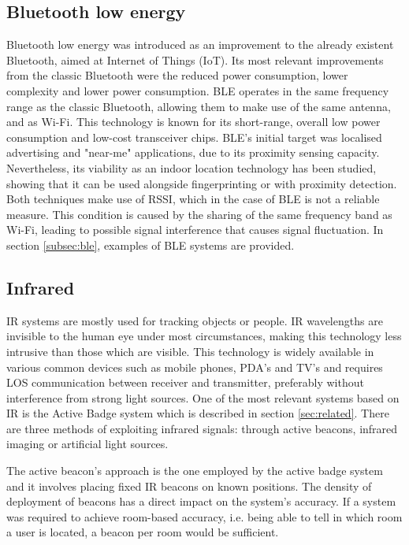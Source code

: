   
  
  
\subsection{Bluetooth low energy}  
\label{subsec:ble-tech}  
  
  
Bluetooth low energy was introduced as an improvement to the already existent Bluetooth, aimed at Internet of Things (IoT). Its most relevant improvements from the classic Bluetooth were the reduced power consumption, lower complexity and lower power consumption. \ac{BLE} operates in the same frequency range as the classic Bluetooth, allowing them to make use of the same antenna, and as Wi-Fi. This technology is known for its short-range, overall low power consumption and low-cost transceiver chips.  
\ac{BLE}'s initial target was localised advertising and "near-me" applications, due to its proximity sensing capacity. Nevertheless, its viability as an indoor location technology has been studied, showing that it can be used alongside fingerprinting or with proximity detection. Both techniques make use of \ac{RSSI}, which in the case of \ac{BLE} is not a reliable measure. This condition is caused by the sharing of the same frequency band as Wi-Fi, leading to possible signal interference that causes signal fluctuation. In section \ref{subsec:ble}, examples of \ac{BLE} systems are provided.  
  
  
\subsection{Infrared}  
\label{subsec:ir}  
  
  
\ac{IR} systems are mostly used for tracking objects or people. \ac{IR} wavelengths are invisible to the human eye under most circumstances, making this technology less intrusive than those which are visible. This technology is widely available in various common devices such as mobile phones, PDA's and TV's and requires \ac{LOS} communication between receiver and transmitter, preferably without interference from strong light sources. One of the most relevant systems based on \ac{IR} is the Active Badge system which is described in section \ref{sec:related}. There are three methods of exploiting infrared signals: through active beacons, infrared imaging or artificial light sources.  
  
The active beacon's approach is the one employed by the active badge system and it involves placing fixed \ac{IR} beacons on known positions. The density of deployment of beacons has a direct impact on the system's accuracy. If a system was required to achieve room-based accuracy, i.e. being able to tell in which room a user is located, a beacon per room would be sufficient.   
  
